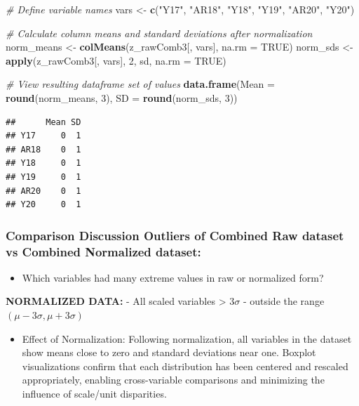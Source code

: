\documentclass[
]{article}
\newenvironment{Shaded}{\begin{snugshade}}{\end{snugshade}}
\newcommand{\AttributeTok}[1]{\textcolor[rgb]{0.13,0.29,0.53}{#1}}
\newcommand{\CommentTok}[1]{\textcolor[rgb]{0.56,0.35,0.01}{\textit{#1}}}
\newcommand{\ConstantTok}[1]{\textcolor[rgb]{0.56,0.35,0.01}{#1}}
\newcommand{\DecValTok}[1]{\textcolor[rgb]{0.00,0.00,0.81}{#1}}
\newcommand{\FunctionTok}[1]{\textcolor[rgb]{0.13,0.29,0.53}{\textbf{#1}}}
\newcommand{\NormalTok}[1]{#1}
\newcommand{\OtherTok}[1]{\textcolor[rgb]{0.56,0.35,0.01}{#1}}
\newcommand{\StringTok}[1]{\textcolor[rgb]{0.31,0.60,0.02}{#1}}
\providecommand{\tightlist}{%
  \setlength{\itemsep}{0pt}\setlength{\parskip}{0pt}}
\begin{document}
\begin{Shaded}
\begin{Highlighting}[]
\CommentTok{\# Define variable names}
\NormalTok{vars }\OtherTok{\textless{}{-}} \FunctionTok{c}\NormalTok{(}\StringTok{"Y17"}\NormalTok{, }\StringTok{"AR18"}\NormalTok{, }\StringTok{"Y18"}\NormalTok{, }\StringTok{"Y19"}\NormalTok{, }\StringTok{"AR20"}\NormalTok{, }\StringTok{"Y20"}\NormalTok{)}

\CommentTok{\# Calculate column means and standard deviations after normalization}
\NormalTok{norm\_means }\OtherTok{\textless{}{-}} \FunctionTok{colMeans}\NormalTok{(z\_rawComb3[, vars], }\AttributeTok{na.rm =} \ConstantTok{TRUE}\NormalTok{)}
\NormalTok{norm\_sds   }\OtherTok{\textless{}{-}} \FunctionTok{apply}\NormalTok{(z\_rawComb3[, vars], }\DecValTok{2}\NormalTok{, sd, }\AttributeTok{na.rm =} \ConstantTok{TRUE}\NormalTok{)}

\CommentTok{\# View resulting dataframe set of values}
\FunctionTok{data.frame}\NormalTok{(}\AttributeTok{Mean =} \FunctionTok{round}\NormalTok{(norm\_means, }\DecValTok{3}\NormalTok{), }\AttributeTok{SD =} \FunctionTok{round}\NormalTok{(norm\_sds, }\DecValTok{3}\NormalTok{))}
\end{Highlighting}
\end{Shaded}

\begin{verbatim}
##      Mean SD
## Y17     0  1
## AR18    0  1
## Y18     0  1
## Y19     0  1
## AR20    0  1
## Y20     0  1
\end{verbatim}

\subsubsection{Comparison Discussion Outliers of Combined Raw dataset vs
Combined Normalized
dataset:}\label{comparison-discussion-outliers-of-combined-raw-dataset-vs-combined-normalized-dataset}

\begin{itemize}
\tightlist
\item
  Which variables had many extreme values in raw or normalized form?
\end{itemize}

\textbf{NORMALIZED DATA:} - All scaled variables \textgreater{}
\(3\sigma\) - outside the range \((\mu - 3\sigma, \mu+3\sigma)\)

\begin{itemize}
\tightlist
\item
  Effect of Normalization: Following normalization, all variables in the
  dataset show means close to zero and standard deviations near one.
  Boxplot visualizations confirm that each distribution has been
  centered and rescaled appropriately, enabling cross-variable
  comparisons and minimizing the influence of scale/unit disparities.
\end{itemize}
\end{document}
